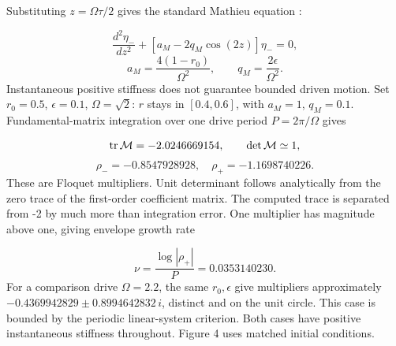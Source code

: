 \documentclass[aip,adv,preprint,floatfix]{revtex4-2}
\begin{document}
Substituting $z=\Omega\tau/2$ gives the standard Mathieu equation \cite{r12}:

\begin{equation}
\frac{d^2\eta_-}{dz^2}+[a_M-2q_M\cos(2z)]\eta_-=0,
\end{equation}
\begin{equation}
a_M=\frac{4(1-r_0)}{\Omega^2},\qquad q_M=\frac{2\epsilon}{\Omega^2}.
\end{equation}
Instantaneous positive stiffness does not guarantee bounded driven motion. Set $r_0=0.5$, $\epsilon=0.1$, $\Omega=\sqrt2$: $r$ stays in $[0.4,0.6]$, with $a_M=1$, $q_M=0.1$. Fundamental-matrix integration over one drive period $P=2\pi/\Omega$ gives

\begin{equation}
\operatorname{tr}{\cal M}=-2.0246669154,\qquad\det{\cal M}\simeq1,
\end{equation}
\begin{equation}
\rho_-=-0.8547928928,\quad \rho_+=-1.1698740226.
\end{equation}
These are Floquet multipliers. Unit determinant follows analytically from the zero trace of the first-order coefficient matrix. The computed trace is separated from -2 by much more than integration error. One multiplier has magnitude above one, giving envelope growth rate

\begin{equation}
\nu=\frac{\log|\rho_+|}{P}=0.0353140230.
\end{equation}
For a comparison drive $\Omega=2.2$, the same $r_0,\epsilon$ give multipliers approximately $-0.4369942829\pm0.8994642832\,i$, distinct and on the unit circle. This case is bounded by the periodic linear-system criterion. Both cases have positive instantaneous stiffness throughout. Figure 4 uses matched initial conditions.
\end{document}
